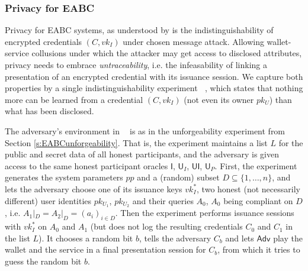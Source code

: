 \documentclass[runningheads]{llncs}
\renewcommand{\adv}{\mathsf{Adv}}
\DeclareMathOperator{\ExpPriv}{\ensuremath{\mathsf{Exp}_{\adv}^{priv}}}
\begin{document}





\subsubsection{Privacy for EABC}
\label{s:EABCprivacy}
%

\ifCANS
\else
Privacy for EABC systems, as understood by \cite{towardsEABC} is the indistinguishability of encrypted credentials $(C,vk_I)$ under chosen message attack. 
Allowing wallet-service collusions under which the attacker may get access to disclosed attributes, privacy needs to embrace \emph{untraceability}, i.e. the infeasability of linking  a presentation of an encrypted credential with its  issuance session. 
We capture both properties by a single indistinguishability experiment  $\ExpPriv$, which states that nothing more can be learned from a credential $(C,vk_I)$ (not even its owner $pk_U$) than what has been disclosed.
\fi

The adversary's environment in  $\ExpPriv$  is as in the unforgeability experiment from Section \ref{s:EABCunforgeability}.
That is, the experiment maintains a list $L$ for the public and secret data of all honest participants, and 
the adversary is given access to the same honest participant oracles $\mathsf{I}$, $\mathsf{U}_I$, $\mathsf{UI}$, $\mathsf{U}_P$.
First, the experiment generates the system parameters $pp$ and a (random) subset $D\subseteq\{1,\ldots,n\}$, and lets the adversary choose one of its issuance keys $vk_I^*$, two honest (not necessarily different) user identities $pk_{U_1}$, $pk_{U_2}$ and their queries $A_0$, $A_0$ being compliant on $D$, i.e. $A_1|_D=A_2|_D =(a_i)_{i\in D}$.
Then the experiment performs issuance sessions with $vk_I^*$ on $A_0$ and $A_1$ (but does not log the resulting credentials $C_0$ and $C_1$ in the list $L$).
It chooses a random bit $b$, tells the adversary $C_b$ and lets $\adv$ play the wallet and the service in a final presentation session for $C_b$, from which it tries  to guess the random bit $b$. 
\end{document}
